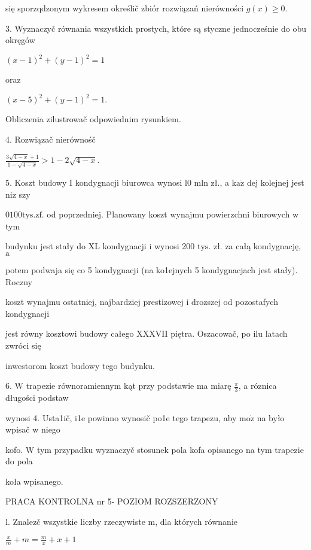 \documentclass[a4paper,12pt]{article}
\begin{document}
się sporzqdzonym wykresem określič zbiór rozwiązań nierówności $g(x)\geq 0.$

3. Wyznaczyč równania wszystkich prostych, które są styczne jednocześnie do obu okręgów

$(x-1)^{2}+(y-1)^{2}=1$

oraz

$(x-5)^{2}+(y-1)^{2}=1.$

Obliczenia zilustrowač odpowiednim rysunkiem.

4. Rozwiązač nierównośč

$\displaystyle \frac{3\sqrt{4-x}+1}{1-\sqrt{4-x}}>1-2\sqrt{4-x}.$

5. Koszt budowy I kondygnacji biurowca wynosi l0 mln zł., a $\mathrm{k}\mathrm{a}\dot{\mathrm{z}}$ dej kolejnej jest $\mathrm{n}\mathrm{i}\dot{\mathrm{z}}$ szy

$0100\mathrm{t}\mathrm{y}\mathrm{s}. \mathrm{z}\mathrm{f}$. od poprzedniej. Planowany koszt wynajmu powierzchni biurowych $\mathrm{w}$ tym

budynku jest stały do XL kondygnacji $\mathrm{i}$ wynosi 200 $\mathrm{t}\mathrm{y}\mathrm{s}$. zł. za całą kondygnację, $\mathrm{a}$

potem podwaja się co 5 kondygnacji (na ko1ejnych 5 kondygnacjach jest stały). Roczny

koszt wynajmu ostatniej, najbardziej prestizowej $\mathrm{i}$ drozszej od pozostafych kondygnacji

jest równy kosztowi budowy całego XXXVII piętra. Oszacowač, po ilu latach zwróci się

inwestorom koszt budowy tego budynku.

6. $\mathrm{W}$ trapezie równoramiennym kąt przy podstawie ma miarę $\displaystyle \frac{\pi}{3}$, a róznica długości podstaw

wynosi 4. Usta1ič, i1e powinno wynosič po1e tego trapezu, aby $\mathrm{m}\mathrm{o}\dot{\mathrm{z}}$ na było wpisač $\mathrm{w}$ niego

kofo. $\mathrm{W}$ tym przypadku wyznaczyč stosunek pola kofa opisanego na tym trapezie do pola

koła wpisanego.





PRACA KONTROLNA nr 5- POZIOM ROZSZERZONY

l. Znalez$\acute{}$č wszystkie liczby rzeczywiste m, dla których równanie

$\displaystyle \frac{x}{m}+m=\frac{m}{x}+x+1$
\end{document}
